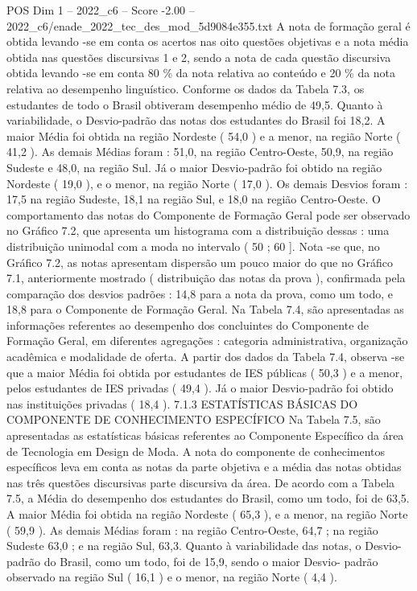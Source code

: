 \begin{textsample}{POS Dim 1 – 2022\_c6 – Score -2.00 – 2022\_c6/enade\_2022\_tec\_des\_mod\_5d9084e355.txt}
A nota de formação geral é obtida levando -se em conta os acertos nas oito questões objetivas e a nota média obtida nas questões discursivas 1 e 2, sendo a nota de cada questão discursiva obtida levando -se em conta 80 \% da nota relativa ao conteúdo e 20 \% da nota relativa ao desempenho linguístico.
Conforme os dados da Tabela 7.3, os estudantes de todo o Brasil obtiveram desempenho médio de 49,5.
Quanto à variabilidade, o Desvio-padrão das notas dos estudantes do Brasil foi 18,2.
A maior Média foi obtida na região Nordeste ( 54,0 ) e a menor, na região Norte ( 41,2 ).
As demais Médias foram : 51,0, na região Centro-Oeste, 50,9, na região Sudeste e 48,0, na região Sul.
Já o maior Desvio-padrão foi obtido na região Nordeste ( 19,0 ), e o menor, na região Norte ( 17,0 ).
Os demais Desvios foram : 17,5 na região Sudeste, 18,1 na região Sul, e 18,0 na região Centro-Oeste.
O comportamento das notas do Componente de Formação Geral pode ser observado no Gráfico 7.2, que apresenta um histograma com a distribuição dessas : uma distribuição unimodal com a moda no intervalo ( 50 ; 60 ].
Nota -se que, no Gráfico 7.2, as notas apresentam dispersão um pouco maior do que no Gráfico 7.1, anteriormente mostrado ( distribuição das notas da prova ), confirmada pela comparação dos desvios padrões : 14,8 para a nota da prova, como um todo, e 18,8 para o Componente de Formação Geral.
Na Tabela 7.4, são apresentadas as informações referentes ao desempenho dos concluintes do Componente de Formação Geral, em diferentes agregações : categoria administrativa, organização acadêmica e modalidade de oferta.
A partir dos dados da Tabela 7.4, observa -se que a maior Média foi obtida por estudantes de IES públicas ( 50,3 ) e a menor, pelos estudantes de IES privadas ( 49,4 ).
Já o maior Desvio-padrão foi obtido nas instituições privadas ( 18,4 ). 7.1.3 ESTATÍSTICAS BÁSICAS DO COMPONENTE DE CONHECIMENTO ESPECÍFICO Na Tabela 7.5, são apresentadas as estatísticas básicas referentes ao Componente Específico da área de Tecnologia em Design de Moda.
A nota do componente de conhecimentos específicos leva em conta as notas da parte objetiva e a média das notas obtidas nas três questões discursivas parte discursiva da área.
De acordo com a Tabela 7.5, a Média do desempenho dos estudantes do Brasil, como um todo, foi de 63,5.
A maior Média foi obtida na região Nordeste ( 65,3 ), e a menor, na região Norte ( 59,9 ).
As demais Médias foram : na região Centro-Oeste, 64,7 ; na região Sudeste 63,0 ; e na região Sul, 63,3.
Quanto à variabilidade das notas, o Desvio-padrão do Brasil, como um todo, foi de 15,9, sendo o maior Desvio- padrão observado na região Sul ( 16,1 ) e o menor, na região Norte ( 4,4 ).

\end{textsample}
